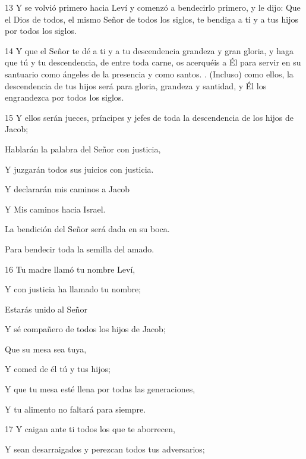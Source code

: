 \par 13 Y se volvió primero hacia Leví y comenzó a bendecirlo primero, y le dijo: Que el Dios de todos, el mismo Señor de todos los siglos, te bendiga a ti y a tus hijos por todos los siglos.
\par 14 Y que el Señor te dé a ti y a tu descendencia grandeza y gran gloria, y haga que tú y tu descendencia, de entre toda carne, os acerquéis a Él para servir en su santuario como ángeles de la presencia y como santos. . (Incluso) como ellos, la descendencia de tus hijos será para gloria, grandeza y santidad, y Él los engrandezca por todos los siglos.
\par 15 Y ellos serán jueces, príncipes y jefes de toda la descendencia de los hijos de Jacob;
\par    
\par     Hablarán la palabra del Señor con justicia,  
\par     Y juzgarán todos sus juicios con justicia.
\par    
\par     Y declararán mis caminos a Jacob  
\par     Y Mis caminos hacia Israel.
\par    
\par     La bendición del Señor será dada en su boca.  
\par     Para bendecir toda la semilla del amado.
\par    
\par 16 Tu madre llamó tu nombre Leví,  
\par     Y con justicia ha llamado tu nombre;
\par    
\par     Estarás unido al Señor  
\par     Y sé compañero de todos los hijos de Jacob;
\par    
\par     Que su mesa sea tuya,  
\par     Y comed de él tú y tus hijos;
\par    
\par     Y que tu mesa esté llena por todas las generaciones,  
\par     Y tu alimento no faltará para siempre.
\par    
\par 17 Y caigan ante ti todos los que te aborrecen,  
\par     Y sean desarraigados y perezcan todos tus adversarios;
\par    
